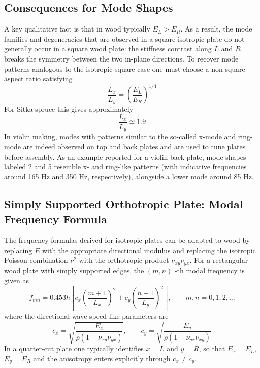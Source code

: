 \subsection{Consequences for Mode Shapes}


A key qualitative fact is that in wood typically \( E_L>E_R \). As a result, the mode families and degeneracies that are observed in a square isotropic plate do not generally occur in a square wood plate: the stiffness contrast along \( L \) and \( R \) breaks the symmetry between the two in-plane directions. To recover mode patterns analogous to the isotropic-square case one must choose a non-square aspect ratio satisfying
\[
\frac{L_x}{L_y} = \left(\frac{E_L}{E_R}\right)^{1/4}
\]
For Sitka spruce this gives approximately
\[
\frac{L_x}{L_y} \simeq 1.9
\]
In violin making, modes with patterns similar to the so-called x-mode and ring-mode are indeed observed on top and back plates and are used to tune plates before assembly. As an example reported for a violin back plate, mode shapes labeled 2 and 5 resemble x- and ring-like patterns (with indicative frequencies around 165 Hz and 350 Hz, respectively), alongside a lower mode around 85 Hz. 

\subsection{Simply Supported Orthotropic Plate: Modal Frequency Formula}

The frequency formulas derived for isotropic plates can be adapted to wood by replacing \( E \) with the appropriate directional modulus and replacing the isotropic Poisson combination \( \nu^{2} \) with the orthotropic product \( \nu_{xy}\nu_{yx} \). For a rectangular wood plate with simply supported edges, the \( (m,n) \) -th modal frequency is given as
\[
f_{mn}
 = 
0.453h
\left[
c_x\left(\frac{m+1}{L_x}\right)^{2}
+
c_y\left(\frac{n+1}{L_y}\right)^{2}
\right],
\qquad m,n = 0,1,2,\dots
\]
where the directional wave-speed-like parameters are
\[
c_x = \sqrt{\frac{E_x}{\rho\left(1-\nu_{xy}\nu_{yx}\right)}},
\qquad
c_y = \sqrt{\frac{E_y}{\rho\left(1-\nu_{yx}\nu_{xy}\right)}}
\]
In a quarter-cut plate one typically identifies \( x = L \) and \( y = R \), so that \( E_x = E_L \), \( E_y = E_R \) and the anisotropy enters explicitly through \( c_x\neq c_y \).


